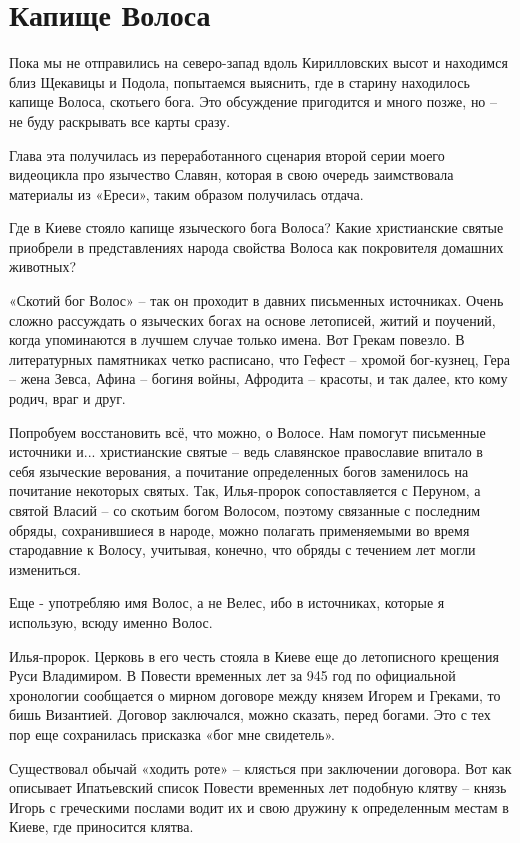 \chapter{Капище Волоса}

    Пока мы не отправились на северо-запад вдоль Кирилловских высот и находимся близ Щекавицы и Подола, попытаемся выяснить, где в старину находилось капище Волоса, скотьего бога. Это обсуждение пригодится и много позже, но – не буду раскрывать все карты сразу.

    Глава эта получилась из переработанного сценария второй серии моего видеоцикла про язычество Славян, которая в свою очередь заимствовала материалы из «Ереси», таким образом получилась отдача.

    Где в Киеве стояло капище языческого бога Волоса? Какие христианские святые приобрели в представлениях народа свойства Волоса как покровителя домашних животных?

   «Скотий бог Волос» – так он проходит в давних письменных источниках. Очень сложно рассуждать о языческих богах на основе летописей, житий и поучений, когда упоминаются в лучшем случае только имена. Вот Грекам повезло. В литературных памятниках четко расписано, что Гефест – хромой бог-кузнец, Гера – жена Зевса, Афина – богиня войны, Афродита – красоты, и так далее, кто кому родич, враг и друг.

Попробуем восстановить всё, что можно, о Волосе. Нам помогут письменные источники и... христианские святые – ведь славянское православие впитало в себя языческие верования, а почитание определенных богов заменилось на почитание некоторых святых. Так, Илья-пророк сопоставляется с Перуном, а святой Власий – со скотьим богом Волосом, поэтому связанные с последним обряды, сохранившиеся в народе, можно полагать применяемыми во время стародавние к Волосу, учитывая, конечно, что обряды с течением лет могли измениться.

Еще - употребляю имя Волос, а не Велес, ибо в источниках, которые я использую, всюду именно Волос.

Илья-пророк. Церковь в его честь стояла в Киеве еще до летописного крещения Руси Владимиром. В Повести временных лет за 945 год по официальной хронологии сообщается о мирном договоре между князем Игорем и Греками, то бишь Византией. Договор заключался, можно сказать, перед богами. Это с тех пор еще сохранилась присказка «бог мне свидетель».

Существовал обычай «ходить роте»  –  клясться при заключении договора. Вот как описывает Ипатьевский список Повести временных лет подобную клятву – князь Игорь с греческими послами водит их и свою дружину к определенным местам в Киеве, где приносится клятва.

